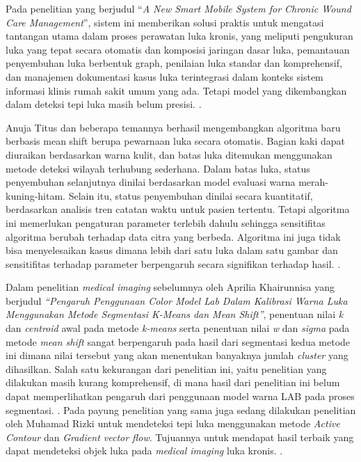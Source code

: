 Pada penelitian yang berjudul “\textit{A New Smart Mobile System for Chronic Wound Care Management}”, sistem ini memberikan solusi praktis untuk mengatasi tantangan utama dalam proses perawatan luka kronis, yang meliputi pengukuran luka yang tepat secara otomatis dan komposisi jaringan dasar luka, pemantauan penyembuhan luka berbentuk graph, penilaian luka standar dan komprehensif, dan manajemen dokumentasi kasus luka terintegrasi dalam konteks sistem informasi klinis rumah sakit umum yang ada. Tetapi model yang dikembangkan dalam deteksi tepi luka masih belum presisi. \citep{wang2018new}.

Anuja Titus dan beberapa temannya berhasil mengembangkan algoritma baru berbasis mean shift berupa pewarnaan luka secara otomatis. Bagian kaki dapat diuraikan berdasarkan warna kulit, dan batas luka ditemukan menggunakan metode deteksi wilayah terhubung sederhana. Dalam batas luka, status penyembuhan selanjutnya dinilai berdasarkan model evaluasi warna merah-kuning-hitam. Selain itu, status penyembuhan dinilai secara kuantitatif, berdasarkan analisis tren catatan waktu untuk pasien tertentu. Tetapi algoritma ini memerlukan pengaturan parameter terlebih dahulu sehingga sensitifitas algoritma berubah terhadap data citra yang berbeda. Algoritma ini juga tidak bisa menyelesaikan kasus dimana lebih dari satu luka dalam satu gambar dan sensitifitas terhadap parameter berpengaruh secara signifikan terhadap hasil. \citep{titus2017smartphone}.

Dalam penelitian \textit{medical imaging} sebelumnya oleh Aprilia Khairunnisa yang berjudul \textit{“Pengaruh Penggunaan Color Model Lab Dalam Kalibrasi Warna Luka Menggunakan Metode Segmentasi K-Means dan Mean Shift”}, penentuan nilai \textit{k} dan \textit{centroid} awal pada metode \textit{k-means} serta penentuan nilai \textit{w} dan \textit{sigma} pada metode \textit{mean shift} sangat berpengaruh pada hasil dari segmentasi kedua metode ini dimana nilai tersebut yang akan menentukan banyaknya jumlah \textit{cluster} yang dihasilkan. Salah satu kekurangan dari penelitian ini, yaitu penelitian yang dilakukan masih kurang komprehensif, di mana hasil dari penelitian ini belum dapat memperlihatkan pengaruh dari penggunaan model warna LAB pada proses segmentasi. \citep{khairunnisa2021pengaruh}. Pada payung penelitian yang sama juga sedang dilakukan penelitian oleh Muhamad Rizki untuk mendeteksi tepi luka menggunakan metode \textit{Active Contour} dan \textit{Gradient vector flow}. Tujuannya untuk mendapat hasil terbaik yang dapat mendeteksi objek luka pada \textit{medical imaging} luka kronis. \citep{rizki2022deteksi}.


